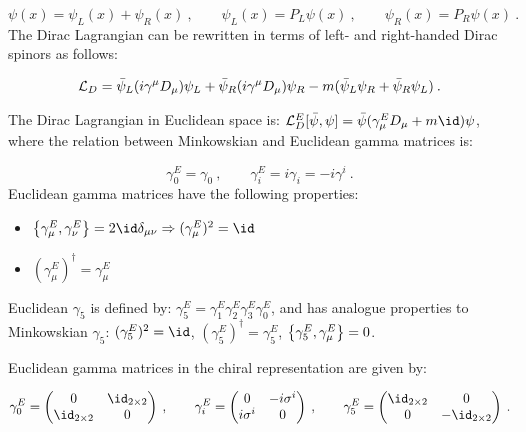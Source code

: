 \begin{equation}
\psi(x) = \psi_L(x)+ \psi_R(x) \: , \qquad\psi_L(x) = P_L \psi(x) \: , \qquad \psi_R(x) = P_R \psi(x) \: .
\end{equation}
%
The Dirac Lagrangian can be rewritten in terms of left- and right-handed Dirac spinors as follows:

\begin{equation}
\mathcal L_D = \bar \psi_L (i \gamma^{\mu} D_{\mu}) \psi_L + \bar \psi_R (i \gamma^{\mu} D_{\mu}) \psi_R -m (\bar\psi_L \psi_R + \bar\psi_R \psi_L) \: .
\end{equation}

The Dirac Lagrangian in Euclidean space is: $\Lag_D^E [\bar \psi, \psi] = \bar \psi (\gamma_{\mu}^E D_{\mu} + m \id) \psi$, where the relation between Minkowskian and Euclidean gamma matrices is:

\begin{equation}
\gamma_0^E = \gamma_0 \: , \qquad \gamma_i^E = i \gamma_i = -i \gamma^i \: .
\end{equation}
%
Euclidean gamma matrices have the following properties: 

\begin{itemize}
\item $\qty \big{\gamma_{\mu}^E, \gamma_{\nu}^E} = 2 \id \delta_{\mu \nu} \Rightarrow (\gamma_{\mu}^E)^2 = \id$
\item $(\gamma_{\mu}^E)^{\dagger} = \gamma_{\mu}^E$
\end{itemize}

Euclidean $\gamma_5$ is defined by: $\gamma_5^E =  \gamma_1^E \gamma_2^E \gamma_3^E \gamma_0^E$, and has analogue properties to Minkowskian $\gamma_5$: $(\gamma_5^E)^2=\id$, $(\gamma_5^E)^{\dagger} = \gamma_5^E$, $\qty \big{\gamma_5^E, \gamma_{\mu}^E} = 0$.

Euclidean gamma matrices in the chiral representation are given by:

\begin{equation}
\gamma_0^E = 
\begin{pmatrix}
0 & \id_{2 \times 2} \\
\id_{2 \times 2} & 0
\end{pmatrix}
\: ,
\qquad
\gamma_i^E = 
\begin{pmatrix}
0 & -i \sigma^i \\
i \sigma^i & 0
\end{pmatrix}
\: ,
\qquad
\gamma_5^E = 
\begin{pmatrix}
\id_{2 \times 2} & 0 \\
0  & -\id_{2 \times 2}
\end{pmatrix}
\: .
\end{equation}

